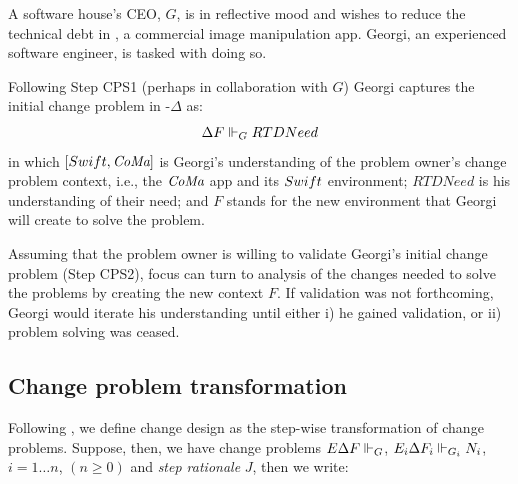 \documentclass[runningheads,a4paper]{llncs}
\begin{document}
\newcommand{\RTDNeed}{\ensuremath{RTDNeed}}
\newcommand{\GeorgiStepMinusOne}{[\Java,\ColourMaker{}]\Delta F\meets_G \RTDNeed}
%
\begin{example}
A software house's CEO, $G$, is in reflective mood and wishes to reduce the technical debt in \ColourMaker{}, a commercial image manipulation app. Georgi, an experienced software engineer, is tasked with doing so.

Following Step CPS1 (perhaps in collaboration with $G$) Georgi captures the initial change problem in \POE{}-$\Delta$ as:
%
\begin{equation}
	\GeorgiStepMinusOne
\end{equation}
%
in which $[Swift,\textit{CoMa}]$ is Georgi's understanding of the problem owner's change problem context, i.e., the $\textit{CoMa}{}$ app and its $Swift$ environment; $\RTDNeed$ is his understanding of their need; and $F$ stands for the new environment that Georgi will create to solve the problem. 

Assuming that the problem owner is willing to validate Georgi's initial change problem (Step CPS2), focus can turn to analysis of the changes needed to solve the problems by creating the new context $F$. If validation was not forthcoming, Georgi would iterate his understanding until either i) he gained validation, or ii) problem solving was ceased.
\end{example}
%

 

\subsection{Change problem transformation}

Following \POE{}, we define change design as the step-wise transformation of change problems. Suppose, then, we have change problems $E\Delta F\Vdash_G$, $E_i\Delta F_i \Vdash_{G_i} N_i$, $i = 1 \dots n$, $(n \geq 0)$ and \textit{step rationale} $J$, then we write:
\end{document}

